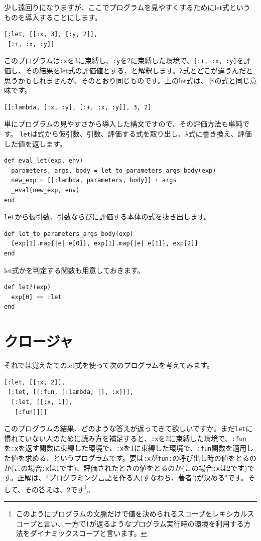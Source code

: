 少し遠回りになりますが、ここでプログラムを見やすくするためにlet式というものを導入することにします。

\begin{lstlisting}
[:let, [[:x, 3], [:y, 2]],
 [:+, :x, :y]]
\end{lstlisting}

このプログラムは{\tt :x}を3に束縛し、{\tt :y}を2に束縛した環境で、{\tt [:+, :x, :y]}を評価し、その結果をlet式の評価値とする、と解釈します。λ式とどこが違うんだと思うかもしれませんが、そのとおり同じものです。上のlet式は、下の式と同じ意味です。

\begin{lstlisting}
[[:lambda, [:x, :y], [:+, :x, :y]], 3, 2]
\end{lstlisting}

単にプログラムの見やすさから導入した構文ですので、その評価方法も単純です。
{\tt let}は式から仮引数、引数、評価する式を取り出し、λ式に書き換え、評価した値を返します。

\begin{lstlisting}
def eval_let(exp, env)
  parameters, args, body = let_to_parameters_args_body(exp)
  new_exp = [[:lambda, parameters, body]] + args
  _eval(new_exp, env)
end
\end{lstlisting}

{\tt let}から仮引数、引数ならびに評価する本体の式を抜き出します。

\begin{lstlisting}
def let_to_parameters_args_body(exp)
  [exp[1].map{|e| e[0]}, exp[1].map{|e| e[1]}, exp[2]]
end
\end{lstlisting}

let式かを判定する関数も用意しておきます。

\begin{lstlisting}
def let?(exp)
  exp[0] == :let
end
\end{lstlisting}

\section{クロージャ}

それでは覚えたてのlet式を使って次のプログラムを考えてみます。

\begin{lstlisting}
[:let, [[:x, 2]],
 [:let, [[:fun, [:lambda, [], :x]]],
  [:let, [[:x, 1]],
   [:fun]]]]
\end{lstlisting}

このプログラムの結果、どのような答えが返ってきて欲しいですか。まだ{\tt let}に慣れていない人のために読み方を補足すると、{\tt :x}を2に束縛した環境で、{\tt :fun}を{\tt :x}を返す関数に束縛した環境で、{\tt :x}を1に束縛した環境で、{\tt :fun}関数を適用した値を求める、というプログラムです。要は{\tt :x}が{\tt fun:}の呼び出し時の値をとるのか(この場合{\tt :x}は1です)、評価されたときの値をとるのか(この場合{\tt :x}は2です)です。正解は、“プログラミング言語を作る人(すなわち、著者!)が決める"です。そして、その答えは、2です\footnote{このようにプログラムの文脈だけで値を決められるスコープをレキシカルスコープと言い、一方で1が返るようなプログラム実行時の環境を利用する方法をダイナミックスコープと言います。}。

